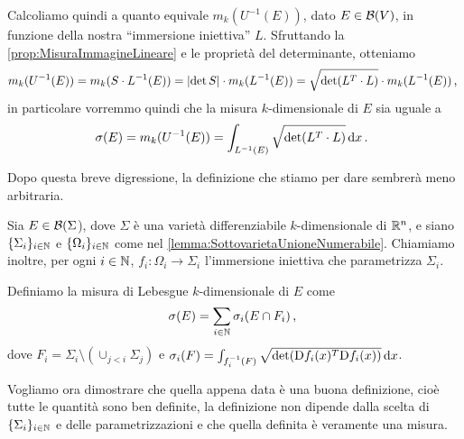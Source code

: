Calcoliamo quindi a quanto equivale $m_k(U^{-1}(E))$, dato $E\in\mathcal B(V)$, in funzione della nostra ``immersione iniettiva'' $L$. Sfruttando la \cref{prop:MisuraImmagineLineare} e le proprietà del determinante, otteniamo
\begin{equation*}
	m_k(U^{-1}(E))=m_k(S\cdot L^{-1}(E))=\lvert\det S\rvert\cdot m_k(L^{-1}(E))=\sqrt{\det(L^T\cdot L)}\cdot m_k(L^{-1}(E))\, \text{, }
\end{equation*}
in particolare vorremmo quindi che la misura $k$-dimensionale di $E$ sia uguale a
\begin{equation*}
	\sigma(E)=m_k(U^{-1}(E))=\int_{L^{-1}(E)}\sqrt{\det(L^T\cdot L)}\,\mathrm d x\, \text{. }
\end{equation*}

Dopo questa breve digressione, la definizione che stiamo per dare sembrerà meno arbitraria.

\begin{definition}\label{def:MisuraKDimensionale}
	Sia $E\in\mathcal B(\Sigma$), dove $\Sigma$ è una varietà differenziabile $k$-dimensionale di $\mathbb R^n$, e siano $\{\Sigma_i\}_{i\in\mathbb N}$ e $\{\Omega_i\}_{i\in\mathbb N}$ come nel \cref{lemma:SottovarietaUnioneNumerabile}. Chiamiamo inoltre, per ogni $i\in\mathbb N$, $f_i:\Omega_i\to\Sigma_i$ l'immersione iniettiva che parametrizza $\Sigma_i$.
	
	Definiamo la misura di Lebesgue $k$-dimensionale di $E$ come
	\begin{equation*}
		\sigma(E)=\sum_{i\in\mathbb N} \sigma_i(E\cap F_i)\, \text{, }
	\end{equation*}
	dove $F_i=\Sigma_i\setminus (\cup_{j<i}\Sigma_j)$ e $\sigma_i(F)=\int_{f_i^{-1}(F)}\sqrt{\det(\mathrm D f_i(x)^T\mathrm D f_i(x))} \,\mathrm d x$.
\end{definition}

Vogliamo ora dimostrare che quella appena data è una buona definizione, cioè tutte le quantità sono ben definite, la definizione non dipende dalla scelta di $\{\Sigma_i\}_{i\in\mathbb N}$ e delle parametrizzazioni e che quella definita è veramente una misura.

